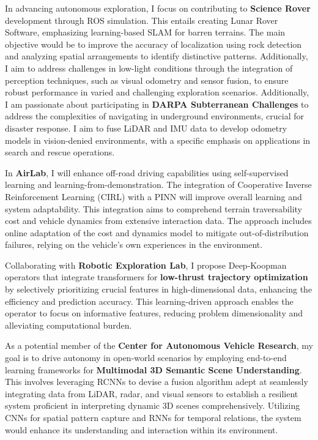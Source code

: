 \documentclass[a4,20pt]{article}
\begin{document}
\begin{large}
In advancing autonomous exploration, I focus on contributing to \textbf{Science Rover} development through ROS simulation. This entails creating Lunar Rover Software, emphasizing learning-based SLAM for barren terrains. The main objective would be to improve the accuracy of localization using rock detection and analyzing spatial arrangements to identify distinctive patterns. Additionally, I aim to address challenges in low-light conditions through the integration of perception techniques, such as visual odometry and sensor fusion, to ensure robust performance in varied and challenging exploration scenarios. Additionally, I am passionate about participating in \textbf{DARPA Subterranean Challenges} to address the complexities of navigating in underground environments, crucial for disaster response. I aim to fuse LiDAR and IMU data to develop odometry models in vision-denied environments, with a specific emphasis on applications in search and rescue operations.

In \textbf{AirLab}, I will enhance off-road driving capabilities using self-supervised learning and learning-from-demonstration. The integration of Cooperative Inverse Reinforcement Learning (CIRL) with a PINN will improve overall learning and system adaptability. This integration aims to comprehend terrain traversability cost and vehicle dynamics from extensive interaction data. The approach includes online adaptation of the cost and dynamics model to mitigate out-of-distribution failures, relying on the vehicle's own experiences in the environment.


Collaborating with \textbf{Robotic Exploration Lab}, I propose Deep-Koopman operators that integrate transformers for \textbf{low-thrust trajectory optimization} by selectively prioritizing crucial features in high-dimensional data, enhancing the efficiency and prediction accuracy. This learning-driven approach enables the operator to focus on informative features, reducing problem dimensionality and alleviating computational burden.

As a potential member of the \textbf{Center for Autonomous Vehicle Research}, my goal is to drive autonomy in open-world scenarios by employing end-to-end learning frameworks for\textbf{ Multimodal 3D Semantic Scene Understanding}. This involves leveraging RCNNs to devise a fusion algorithm adept at seamlessly integrating data from LiDAR, radar, and visual sensors to establish a resilient system proficient in interpreting dynamic 3D scenes comprehensively. Utilizing CNNs for spatial pattern capture and RNNs for temporal relations, the system would enhance its understanding and interaction within its environment.


\end{large}
\end{document}
